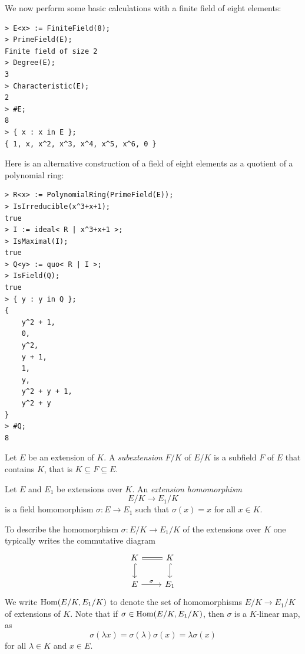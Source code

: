 We now perform some basic calculations 
with a finite field of eight elements: 
\begin{lstlisting}
> E<x> := FiniteField(8);
> PrimeField(E);
Finite field of size 2
> Degree(E);
3
> Characteristic(E);
2
> #E;
8
> { x : x in E };
{ 1, x, x^2, x^3, x^4, x^5, x^6, 0 }
\end{lstlisting}

Here is an alternative construction of a field of eight elements
as a quotient of a polynomial ring:
\begin{lstlisting}
> R<x> := PolynomialRing(PrimeField(E));
> IsIrreducible(x^3+x+1);
true
> I := ideal< R | x^3+x+1 >;
> IsMaximal(I);
true
> Q<y> := quo< R | I >;
> IsField(Q);
true
> { y : y in Q };
{
    y^2 + 1,
    0,
    y^2,
    y + 1,
    1,
    y,
    y^2 + y + 1,
    y^2 + y
}
> #Q;
8    
\end{lstlisting}



\begin{definition}
	Let $E$ be an extension of $K$. A \emph{subextension} $F/K$ 
	of $E/K$ is a subfield $F$ of $E$ that contains $K$, that is
	$K\subseteq F\subseteq E$. 
\end{definition}

\begin{definition}
Let $E$ and $E_1$ be extensions over $K$. An \emph{extension
homomorphism} 
\[
E/K\to E_1/K
\]
is a field homomorphism $\sigma\colon E\to E_1$ such that $\sigma(x)=x$ for all $x\in K$. 
\end{definition}

To describe the homomorphism $\sigma\colon E/K\to E_1/K$ of the extensions over $K$
one typically writes the commutative diagram 
\[
	\begin{tikzcd}
	K & K \\
	E & {E_1} 
	\arrow["\sigma", from=2-1, to=2-2]
	\arrow[equal, no head, from=1-1, to=1-2]
	\arrow[hook, from=1-1, to=2-1]
	\arrow[hook, from=1-2, to=2-2]
\end{tikzcd}
\]
We write $\operatorname{Hom}(E/K,E_1/K)$ to denote
the set of homomorphisms $E/K\to E_1/K$ of extensions of $K$. Note
that if $\sigma\in\operatorname{Hom}(E/K,E_1/K)$, then
$\sigma$ is a $K$-linear map, as
\[
	\sigma(\lambda x)=\sigma(\lambda)\sigma(x)=\lambda\sigma(x)
\]
for all $\lambda\in K$ and $x\in E$. 

